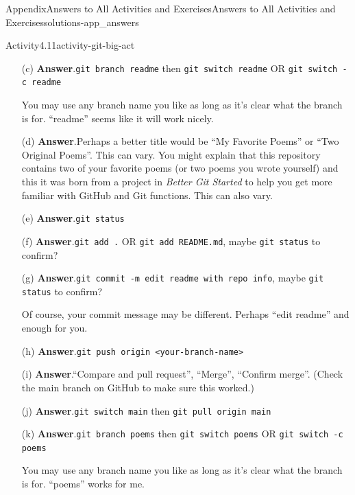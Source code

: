 \documentclass[twoside,10pt,]{book}
\newcommand{\blocktitlefont}{\relax}
\newcommand{\mono}[1]{\texttt{#1}}
\newcommand{\pubtitle}[1]{\textsl{#1}}
\begin{document}
\begin{solutions-chapter}{Appendix}{Answers to All Activities and Exercises}{}{Answers to All Activities and Exercises}{}{}{solutions-app_answers}
\begin{activitysolution}{Activity}{4.11}{}{activity-git-big-act}
\begin{enumerate}[font=\bfseries,label=(\alph*),ref=\alph*]
\item[(c)]\noindent\textbf{\blocktitlefont Answer}.\hypertarget{answer-git-big-act-d-b-back}{}\quad{}\mono{git branch readme} then \mono{git switch readme} OR \mono{git switch -c readme}%
\par
You may use any branch name you like as long as it's clear what the branch is for. ``readme'' seems like it will work nicely.%
\item[(d)]\noindent\textbf{\blocktitlefont Answer}.\hypertarget{answer-git-big-act-e-b-back}{}\quad{}Perhaps a better title would be ``My Favorite Poems'' or ``Two Original Poems''. This can vary. You might explain that this repository contains two of your favorite poems (or two poems you wrote yourself) and this it was born from a project in \pubtitle{Better Git Started} to help you get more familiar with GitHub and Git functions. This can also vary.%
\item[(e)]\noindent\textbf{\blocktitlefont Answer}.\hypertarget{answer-git-big-act-f-b-back}{}\quad{}\mono{git status}%
\item[(f)]\noindent\textbf{\blocktitlefont Answer}.\hypertarget{answer-git-big-act-g-b-back}{}\quad{}\mono{git add .} OR \mono{git add README.md}, maybe \mono{git status} to confirm?%
\item[(g)]\noindent\textbf{\blocktitlefont Answer}.\hypertarget{answer-git-big-act-h-b-back}{}\quad{}\mono{git commit -m \textquotesingle{}edit readme with repo info\textquotesingle{}}, maybe \mono{git status} to confirm?%
\par
Of course, your commit message may be different. Perhaps ``edit readme'' and enough for you.%
\item[(h)]\noindent\textbf{\blocktitlefont Answer}.\hypertarget{answer-git-big-act-i-b-back}{}\quad{}\mono{git push origin <your-branch-name>}%
\item[(i)]\noindent\textbf{\blocktitlefont Answer}.\hypertarget{answer-git-big-act-j-b-back}{}\quad{}``Compare and pull request'', ``Merge'', ``Confirm merge''. (Check the main branch on GitHub to make sure this worked.)%
\item[(j)]\noindent\textbf{\blocktitlefont Answer}.\hypertarget{answer-git-big-act-k-b-back}{}\quad{}\mono{git switch main} then \mono{git pull origin main}%
\item[(k)]\noindent\textbf{\blocktitlefont Answer}.\hypertarget{answer-git-big-act-l-b-back}{}\quad{}\mono{git branch poems} then \mono{git switch poems} OR \mono{git switch -c poems}%
\par
You may use any branch name you like as long as it's clear what the branch is for. ``poems'' works for me.%

\end{enumerate}
\end{activitysolution}
\end{solutions-chapter}
\end{document}
